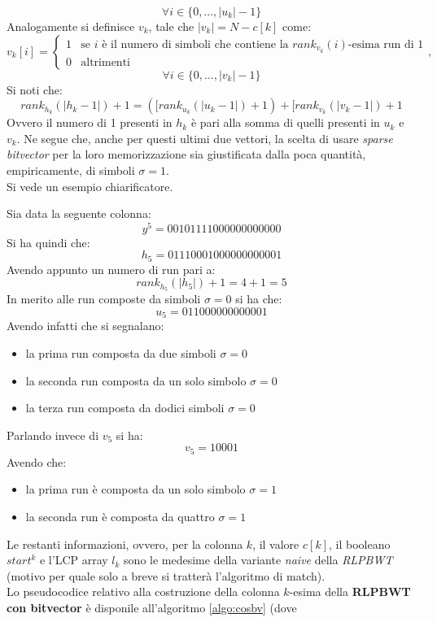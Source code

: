 \vspace{-5mm}
\[\forall i\in\{0,\ldots,|u_k|-1\}\]
Analogamente si definisce $v_k$, tale che $|v_k|=N-c[k]$ come:
\[v_k[i]=
  \begin{cases}
    1&\mbox{se }i \mbox{ è il numero di simboli che contiene la
    }rank_{v_k}(i)\mbox{-esima run di 1}\\
    0&\mbox{altrimenti}
  \end{cases},
\]
\vspace{-5mm}
\[\forall i\in\{0,\ldots,|v_k|-1\}\]
Si noti che:
\[rank_{h_k}(|h_k-1|)+1=([rank_{u_k}(|u_k-1|)+1)+[rank_{v_k}(|v_k-1|)+1\]
Ovvero il numero di 1 presenti in $h_k$ è pari alla somma di quelli presenti in
$u_k$ e $v_k$. Ne segue che, anche per questi ultimi due vettori, la scelta di
usare \textit{sparse bitvector} per la loro memorizzazione sia giustificata
dalla poca quantità, empiricamente, di simboli $\sigma=1$.\\
Si vede un esempio chiarificatore.
\begin{esempio}
  \label{es:bv1}
  Sia data la seguente colonna:
  \[y^5=00101111000000000000\]
  Si ha quindi che:
  \[h_5=01110001000000000001\]
  Avendo appunto un numero di run pari a:
  \[rank_{h_5}(|h_5|)+1=4+1=5\]
  In merito alle run composte da simboli $\sigma=0$ si ha che:
  \[u_5=011000000000001\]
  Avendo infatti che si segnalano:
  \begin{itemize}
    \item la prima run composta da due simboli $\sigma=0$
    \item la seconda run composta da un solo simbolo $\sigma=0$
    \item la terza run composta da dodici simboli $\sigma=0$
  \end{itemize}
  Parlando invece di $v_5$ si ha:
  \[v_5=10001\]
  Avendo che:
  \begin{itemize}
    \item la prima run è composta da un solo simbolo $\sigma=1$
    \item la seconda run è composta da quattro $\sigma=1$
  \end{itemize}
\end{esempio}
Le restanti informazioni, ovvero, per la colonna $k$, il valore $c[k]$, il
booleano $start^k$ e l'LCP array $l_k$ sono le medesime della variante
\textit{naive} della \textit{RLPBWT} (motivo per quale solo a breve si
tratterà l'algoritmo di match).\\
Lo pseudocodice relativo alla costruzione della colonna $k$-esima della
\textbf{RLPBWT con bitvector} è disponile all'algoritmo \ref{algo:cosbv} (dove
